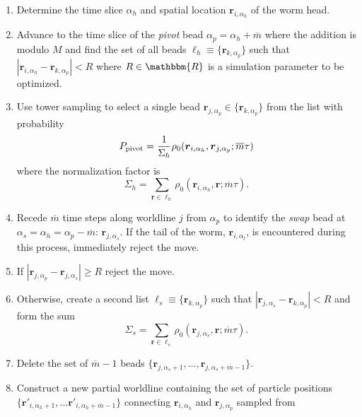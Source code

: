 \documentclass[prb,10pt,aps,floatfix,notitlepage]{revtex4-1}
\renewcommand{\vec}[1]{\boldsymbol{#1}}
\begin{document}
\begin{enumerate}
    \item Determine the time slice $\alpha_h$ and spatial location
        $\vec{r}_{i,\alpha_h}$ of the worm head.
    \item Advance to the time slice of the \emph{pivot} bead $\alpha_p =
        \alpha_h + \overline{m}$ where the addition is modulo $M$ and find the
        set of all beads $\ell_h \equiv \{\vec{r}_{k,\alpha_p}\}$ such that
        $|\vec{r}_{i,\alpha_h} - \vec{r}_{k,\alpha_p}| < R$ where $R \in
        \mathbbm{R}$ is a simulation parameter to be optimized.
\item Use tower sampling to select a single bead $\vec{r}_{j,\alpha_p} \in
    \{\vec{r}_{k,\alpha_p}\}$ from the list with probability
\begin{equation}
    P_{\rm pivot} = \frac{1}{\Sigma_h}
    \rho_0(\vec{r}_{i,\alpha_h},\vec{r}_{j,\alpha_p};\overline{m}\tau)
\end{equation}
%
where the normalization factor is
%
\begin{equation}
\Sigma_h = \sum_{\vec{r}\in\ell_h} 
    \rho_0(\vec{r}_{i,\alpha_h},\vec{r};\overline{m}\tau).
\end{equation}
%
\item Recede $\overline{m}$ time steps along worldline $j$ from $\alpha_p$ to
    identify the \emph{swap} bead at $\alpha_s = \alpha_h =
    \alpha_p-\overline{m}$: $\vec{r}_{j,\alpha_s}$. If the tail of the worm,
    $\vec{r}_{i,\alpha_t}$, is encountered during this process, immediately reject the move.
\item If $|\vec{r}_{j,\alpha_p} - \vec{r}_{j,\alpha_s}| \ge R$ reject the move.
\item Otherwise, create a second list $\ell_s \equiv \{\vec{r}_{k,\alpha_p}\}$ such
    that $|\vec{r}_{j,\alpha_s} - \vec{r}_{k,\alpha_p}| < R$ and form the sum
\begin{equation}
\Sigma_s = \sum_{\vec{r}\in\ell_s} 
    \rho_0(\vec{r}_{j,\alpha_s},\vec{r};\overline{m}\tau).
\end{equation}
%
\item Delete the set of $\overline{m}-1$ beads
    $\{\vec{r}_{j,\alpha_s+1},\ldots,\vec{r}_{j,\alpha_s+\overline{m}-1} \}$.
\item Construct a new partial worldline containing the set of particle
    positions $\{\vec{r}'_{i,\alpha_h+1},\ldots
    \vec{r}'_{i,\alpha_h+\overline{m}-1}\}$
    connecting $\vec{r}_{i,\alpha_h}$ and $\vec{r}_{j,\alpha_p}$ sampled from

\end{enumerate}
\end{document}
